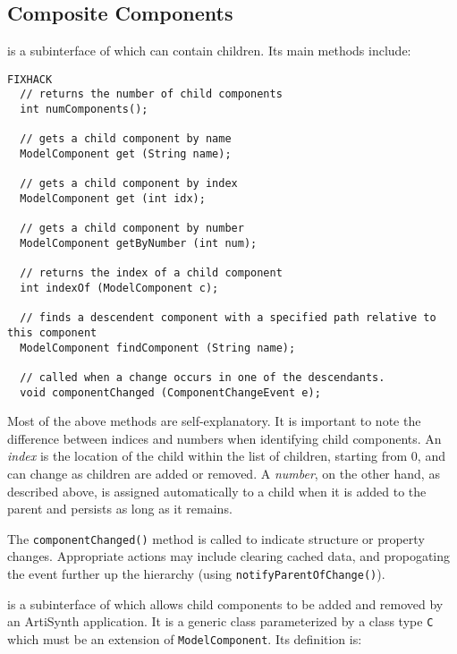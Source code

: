 \documentclass{article}
\begin{document}
\subsection{Composite Components}
\label{CompositeComponentSec}

 is a subinterface of 
which can contain children. Its main methods include:

\begin{lstlisting}FIXHACK
  // returns the number of child components
  int numComponents();
 
  // gets a child component by name
  ModelComponent get (String name);

  // gets a child component by index
  ModelComponent get (int idx);

  // gets a child component by number
  ModelComponent getByNumber (int num);

  // returns the index of a child component
  int indexOf (ModelComponent c);

  // finds a descendent component with a specified path relative to this component
  ModelComponent findComponent (String name);

  // called when a change occurs in one of the descendants.
  void componentChanged (ComponentChangeEvent e);
\end{lstlisting}

Most of the above methods are self-explanatory. It is important to
note the difference between indices and numbers when identifying child
components. An {\it index} is the location of the child within the list of
children, starting from 0, and can change as children are added or
removed. A {\it number}, on the other hand, as described above, is
assigned automatically to a child when it is added to the parent and
persists as long as it remains.

The {\tt componentChanged()} method is called to indicate structure or
property changes. Appropriate actions may include clearing cached
data, and propogating the event further up the hierarchy (using
{\tt notifyParentOfChange()}).

 is a subinterface of
 which allows child components to be
added and removed by an ArtiSynth application. It is a generic class
parameterized by a class type {\tt C} which must be an extension of
{\tt ModelComponent}. Its definition is:
\end{document}
